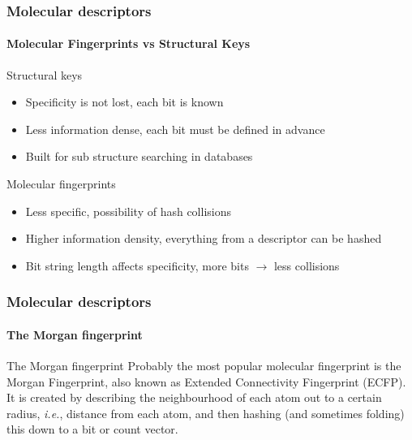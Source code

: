 \documentclass[aspectratio=169]{beamer}
\begin{document}
    \begin{frame}
        \frametitle{Molecular descriptors}
        \framesubtitle{Molecular Fingerprints vs Structural Keys}
        \begin{block}{Structural keys}
            \begin{itemize}
                \item Specificity is not lost, each bit is known
                \item Less information dense, each bit must be defined in advance
                \item Built for sub structure searching in databases
            \end{itemize}
        \end{block}
        \begin{block}{Molecular fingerprints}
            \begin{itemize}
                \item Less specific, possibility of hash collisions
                \item Higher information density, everything from a descriptor can be hashed
                \item Bit string length affects specificity, more bits $\rightarrow$ less collisions
            \end{itemize}
        \end{block}
    \end{frame}
        \begin{frame}
        \frametitle{Molecular descriptors}
        \framesubtitle{The Morgan fingerprint}
        \centering
{}

        \begin{block}{The Morgan fingerprint}
            Probably the most popular molecular fingerprint is the Morgan
            Fingerprint, also known as \alert{Extended Connectivity Fingerprint
            (ECFP)}. It is created by describing the neighbourhood of each atom
            out to a certain radius, \textit{i.e.}, distance from each atom, and
            then hashing (and sometimes folding) this down to a bit or count
            vector.
        \end{block}
    \end{frame}
\end{document}
